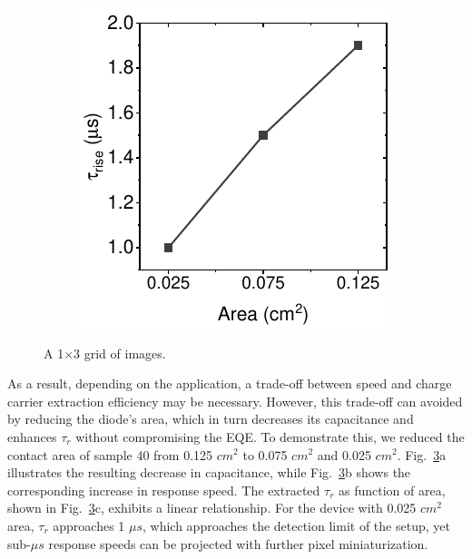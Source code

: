 \begin{figure}[htbp]
\begin{subfigure}{0.3\textwidth}
        \caption{}
        \label{}
    \end{subfigure}
    \hfill
    \begin{subfigure}{0.29\textwidth}
        \centering
        \includegraphics[width=\textwidth]{chapters/transport_layers/images/Rise_time_farea.pdf}
        \caption{}
        \label{}
    \end{subfigure}
    
    \caption{A 1×3 grid of images.}
    \label{fig:etl_opt:dev_area}
\end{figure}

As a result, depending on the application, a trade-off between speed and charge carrier extraction efficiency may be necessary. However, this trade-off can avoided by reducing the diode's area, which in turn decreases its capacitance and enhances $\tau_r$ without compromising the EQE. To demonstrate this, we reduced the contact area of sample 40 from 0.125 $cm^2$ to 0.075 $cm^2$ and 0.025 $cm^2$. Fig.~\ref{fig:etl_opt:dev_area}a illustrates the resulting decrease in capacitance, while Fig.~\ref{fig:etl_opt:dev_area}b shows the corresponding increase in response speed. The extracted $\tau_r$ as function of area, shown in Fig.~\ref{fig:etl_opt:dev_area}c, exhibits a linear relationship. For the device with 0.025 $cm^2$ area, $\tau_r$ approaches 1 $\mu s$, which approaches the detection limit of the setup, yet sub-$\mu s$ response speeds can be projected with further pixel miniaturization. 

